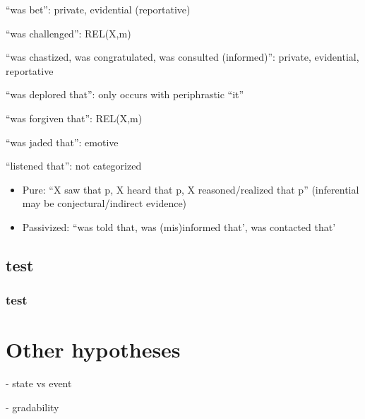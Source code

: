 \documentclass[11pt,fleqn]{article}
\newcommand{\6}{\mbox{$[\hspace*{-.6mm}[$}}
\newcommand{\9}{\mbox{$]\hspace*{-.6mm}]$}}
\begin{document}
\begin{itemize}
\begin{itemize}
``was bet'': private, evidential (reportative)

``was challenged'': REL(X,m)

``was chastized, was congratulated, was consulted (informed)'': private, evidential, reportative

``was deplored that'': only occurs with periphrastic ``it''

``was forgiven that'': REL(X,m)

``was jaded that'': emotive

``listened that'': not categorized

\begin{itemize}

\item Pure: ``X saw that p, X heard that p, X reasoned/realized that p'' (inferential may be conjectural/indirect evidence)

\item Passivized: ``was told that, was (mis)informed that', was contacted that'

\end{itemize}

\end{itemize}

\end{itemize}

\subsection{test}

\subsubsection{test}

\section{Other hypotheses}


- state vs event

- gradability





\end{document}
